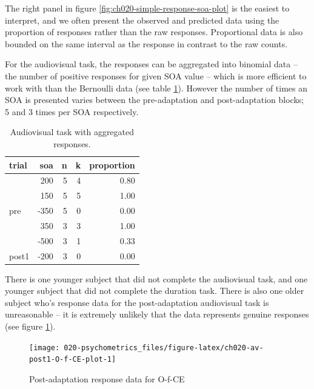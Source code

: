 \documentclass[11pt, oneside, openany]{scrbook}
\begin{document}
The right panel in figure \ref{fig:ch020-simple-response-soa-plot} is the easiest to interpret, and we often present the observed and predicted data using the proportion of responses rather than the raw responses. Proportional data is also bounded on the same interval as the response in contrast to the raw counts.

For the audiovisual task, the responses can be aggregated into binomial data -- the number of positive responses for given SOA value -- which is more efficient to work with than the Bernoulli data (see table \ref{tab:ch020-av-bin-sample}). However the number of times an SOA is presented varies between the pre-adaptation and post-adaptation blocks; 5 and 3 times per SOA respectively.

\begin{table}[!h]

\caption{\label{tab:ch020-av-bin-sample}Audiovisual task with aggregated responses.}
\centering
\begin{tabular}[t]{lrrrr}
\toprule
trial & soa & n & k & proportion\\
\midrule
 & 200 & 5 & 4 & 0.80\\
\cmidrule{2-5}
 & 150 & 5 & 5 & 1.00\\
\cmidrule{2-5}
\multirow[t]{-3}{*}{\raggedright\arraybackslash pre} & -350 & 5 & 0 & 0.00\\
\cmidrule{1-5}
 & 350 & 3 & 3 & 1.00\\
\cmidrule{2-5}
 & -500 & 3 & 1 & 0.33\\
\cmidrule{2-5}
\multirow[t]{-3}{*}{\raggedright\arraybackslash post1} & -200 & 3 & 0 & 0.00\\
\bottomrule
\end{tabular}
\end{table}

There is one younger subject that did not complete the audiovisual task, and one younger subject that did not complete the duration task. There is also one older subject who's response data for the post-adaptation audiovisual task is unreasonable -- it is extremely unlikely that the data represents genuine responses (see figure \ref{fig:ch020-av-post1-O-f-CE-plot}).

\begin{figure}

{\centering \texttt{[image: 020-psychometrics\_files/figure-latex/ch020-av-post1-O-f-CE-plot-1]} 

}

\caption{Post-adaptation response data for O-f-CE}\label{fig:ch020-av-post1-O-f-CE-plot}
\end{figure}
\end{document}
